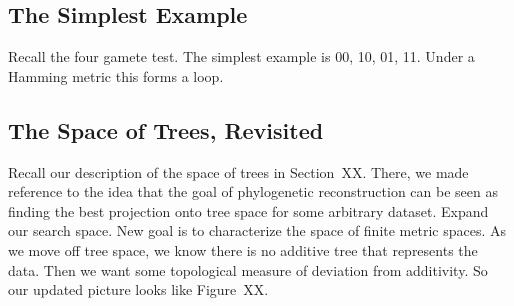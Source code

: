 \subsection{The Simplest Example}

Recall the four gamete test.
The simplest example is 00, 10, 01, 11.
Under a Hamming metric this forms a loop.

\subsection{The Space of Trees, Revisited}

Recall our description of the space of trees in Section~XX.
There, we made reference to the idea that the goal of phylogenetic reconstruction can be seen as finding the best projection onto tree space for some arbitrary dataset.
Expand our search space.
New goal is to characterize the space of finite metric spaces.
As we move off tree space, we know there is no additive tree that represents the data.
Then we want some topological measure of deviation from additivity.
So our updated picture looks like Figure~XX.

